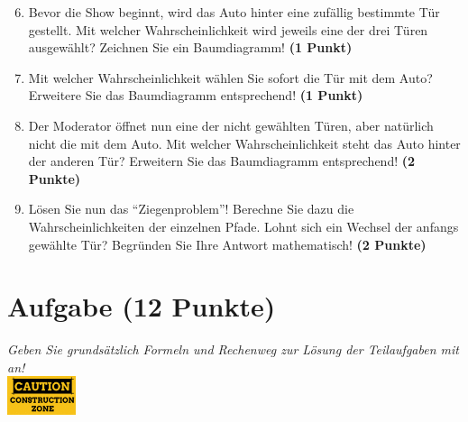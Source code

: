 \documentclass[a4paper, 10pt]{scrartcl}\usepackage[]{graphicx}\usepackage[]{xcolor}
\begin{document}
\begin{enumerate}
  \setcounter{enumi}{5}  
\item Bevor die Show beginnt, wird das Auto hinter eine zuf{\"a}llig bestimmte
  T{\"u}r gestellt. Mit welcher Wahrscheinlichkeit wird jeweils eine der drei
  T{\"u}ren ausgew{\"a}hlt? Zeichnen Sie ein Baumdiagramm! \textbf{(1 Punkt)}
\item Mit welcher Wahrscheinlichkeit w{\"a}hlen Sie sofort die T{\"u}r mit
  dem Auto? Erweitere Sie das Baumdiagramm entsprechend! \textbf{(1
    Punkt)}
\item Der Moderator {\"o}ffnet nun eine der nicht gew{\"a}hlten T{\"u}ren, aber
  nat{\"u}rlich nicht die mit dem Auto. Mit welcher Wahrscheinlichkeit steht
  das Auto hinter der anderen T{\"u}r? Erweitern Sie das Baumdiagramm
  entsprechend! \textbf{(2 Punkte)}
\item L{\"o}sen Sie nun das "`Ziegenproblem"'! Berechne Sie dazu die
  Wahrscheinlichkeiten der einzelnen Pfade. Lohnt sich ein Wechsel der
  anfangs gew{\"a}hlte T{\"u}r? Begr{\"u}nden Sie Ihre Antwort mathematisch!
  \textbf{(2 Punkte)}
\end{enumerate}
 






 
\clearpage

\section{Aufgabe \hfill (12 Punkte)}

\textit{Geben Sie grunds{\"a}tzlich Formeln und Rechenweg zur L{\"o}sung der
  Teilaufgaben mit an!} \\[1Ex]

\hfill\href{}{\includegraphics[width = 2cm]{img/caution}} %
\hspace{2Ex}
\end{document}
